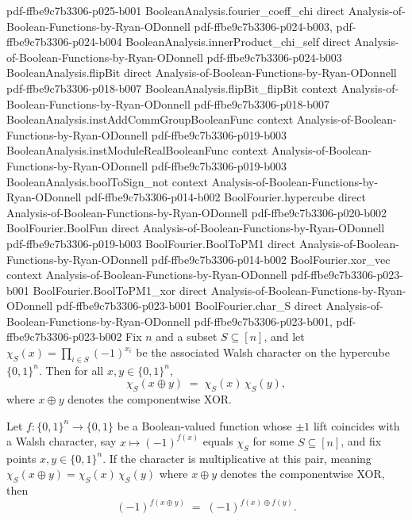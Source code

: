 \begin{lemma}
{    pdf-ffbe9c7b3306-p025-b001}
\proofstep
  {BooleanAnalysis.fourier_coeff_chi}
  {direct}
  {Analysis-of-Boolean-Functions-by-Ryan-ODonnell}
  {pdf-ffbe9c7b3306-p024-b003,
    pdf-ffbe9c7b3306-p024-b004}
\proofstep
  {BooleanAnalysis.innerProduct_chi_self}
  {direct}
  {Analysis-of-Boolean-Functions-by-Ryan-ODonnell}
  {pdf-ffbe9c7b3306-p024-b003}
\proofstep
  {BooleanAnalysis.flipBit}
  {direct}
  {Analysis-of-Boolean-Functions-by-Ryan-ODonnell}
  {pdf-ffbe9c7b3306-p018-b007}
\proofstep
  {BooleanAnalysis.flipBit_flipBit}
  {context}
  {Analysis-of-Boolean-Functions-by-Ryan-ODonnell}
  {pdf-ffbe9c7b3306-p018-b007}
\proofstep
  {BooleanAnalysis.instAddCommGroupBooleanFunc}
  {context}
  {Analysis-of-Boolean-Functions-by-Ryan-ODonnell}
  {pdf-ffbe9c7b3306-p019-b003}
\proofstep
  {BooleanAnalysis.instModuleRealBooleanFunc}
  {context}
  {Analysis-of-Boolean-Functions-by-Ryan-ODonnell}
  {pdf-ffbe9c7b3306-p019-b003}
\proofstep
  {BooleanAnalysis.boolToSign_not}
  {context}
  {Analysis-of-Boolean-Functions-by-Ryan-ODonnell}
  {pdf-ffbe9c7b3306-p014-b002}
\proofstep
  {BoolFourier.hypercube}
  {direct}
  {Analysis-of-Boolean-Functions-by-Ryan-ODonnell}
  {pdf-ffbe9c7b3306-p020-b002}
\proofstep
  {BoolFourier.BoolFun}
  {direct}
  {Analysis-of-Boolean-Functions-by-Ryan-ODonnell}
  {pdf-ffbe9c7b3306-p019-b003}
\proofstep
  {BoolFourier.BoolToPM1}
  {direct}
  {Analysis-of-Boolean-Functions-by-Ryan-ODonnell}
  {pdf-ffbe9c7b3306-p014-b002}
\proofstep
  {BoolFourier.xor_vec}
  {context}
  {Analysis-of-Boolean-Functions-by-Ryan-ODonnell}
  {pdf-ffbe9c7b3306-p023-b001}
\proofstep
  {BoolFourier.BoolToPM1_xor}
  {direct}
  {Analysis-of-Boolean-Functions-by-Ryan-ODonnell}
  {pdf-ffbe9c7b3306-p023-b001}
\proofstep
  {BoolFourier.char_S}
  {direct}
  {Analysis-of-Boolean-Functions-by-Ryan-ODonnell}
  {pdf-ffbe9c7b3306-p023-b001,
    pdf-ffbe9c7b3306-p023-b002}
Fix $n$ and a subset $S \subseteq [n]$, and let $\chi_S(x) = \prod_{i \in S}(-1)^{x_i}$
be the associated Walsh character on the hypercube $\{0,1\}^n$. Then for all $x, y \in
\{0,1\}^n$,
\[
  \chi_S(x \oplus y) \;=\; \chi_S(x)\,\chi_S(y),
\]
where $x \oplus y$ denotes the componentwise XOR.
\end{lemma}

\begin{lemma}
\label{BoolBLR.linear_bool_iff_character_aux_h_eq}
\leanok
{}
Let $f : \{0,1\}^n \to \{0,1\}$ be a Boolean-valued function whose $\pm 1$ lift
coincides with a Walsh character, say $x \mapsto (-1)^{f(x)}$ equals $\chi_S$ for some
$S \subseteq [n]$, and fix points $x, y \in \{0,1\}^n$. If the character is
multiplicative at this pair, meaning $\chi_S(x \oplus y) = \chi_S(x)\,\chi_S(y)$ where
$x \oplus y$ denotes the componentwise XOR, then
\[
  (-1)^{f(x \oplus y)} \;=\; (-1)^{f(x) \oplus f(y)}.
\]
\end{lemma}

